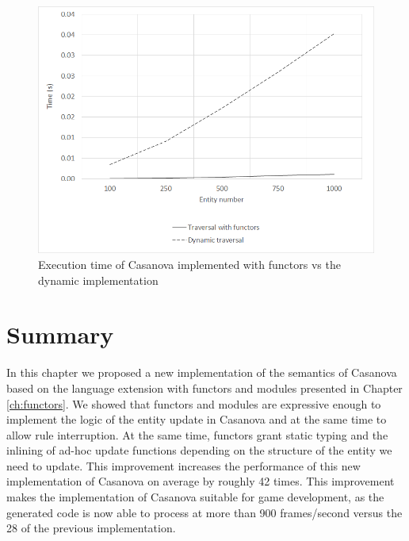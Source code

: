 \begin{figure}[!h]
  \centering
  \includegraphics[width=\textwidth]{Figures/chapter_networking/chart}
  \caption{Execution time of Casanova implemented with functors vs the dynamic implementation}
  \label{fig:ch_networking_chart}
\end{figure}

\section{Summary}
In this chapter we proposed a new implementation of the semantics of Casanova based on the language extension with functors and modules presented in Chapter \ref{ch:functors}. We showed that functors and modules are expressive enough to implement the logic of the entity update in Casanova and at the same time to allow rule interruption. At the same time, functors grant static typing and the inlining of ad-hoc update functions depending on the structure of the entity we need to update. This improvement increases the performance of this new implementation of Casanova on average by roughly 42 times. This improvement makes the implementation of Casanova suitable for game development, as the generated code is now able to process at more than 900 frames/second versus the 28 of the previous implementation.
